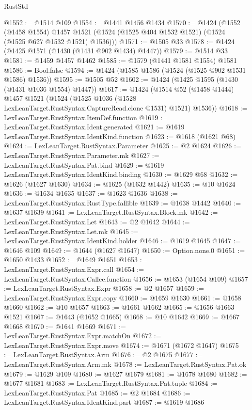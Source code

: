 \begin{lexlean}{RustStd}
\begin{coremodule}
@1552 := @1514 @109
@1554 := @1441 @1456 @1434
@1570 := @1424
    (@1552
      (@1458 @1554)
      @1457
      @1521
      (@1524 (@1525 @404 @1532 @1521) (@1524 (@1525 @627 @1532 @1521) @1536)))
@1571 := @1505 @33
@1578 := @1424 (@1425 @1571 (@1430 (@1431 @902 @1434) @1447))
@1579 := @1514 @33
@1581 := @1459 @1457 @1462
@1585 := @1579 (@1441 @1581 @1554) @1581
@1586 := Bool.false
@1594 := @1424 (@1585 @1586 (@1524 (@1525 @902 @1531 @1586) @1536))
@1595 := @1505 @52
@1602 := @1424 (@1425 @1595 (@1430 (@1431 @1036 @1554) @1447))
@1617 := @1424
    (@1514
      @52
      (@1458 @1444)
      @1457
      @1521
      (@1524 (@1525 @1036 (@1528 LexLeanTarget.RustSyntax.CaptureRead.clone @1531) @1521) @1536))
@1618 := LexLeanTarget.RustSyntax.ItemDef.function
@1619 := LexLeanTarget.RustSyntax.Ident.generated
@1621 := @1619 LexLeanTarget.RustSyntax.IdentKind.function
@1623 := @1618 (@1621 @68)
@1624 := LexLeanTarget.RustSyntax.Parameter
@1625 := @2 @1624
@1626 := LexLeanTarget.RustSyntax.Parameter.mk
@1627 := LexLeanTarget.RustSyntax.Pat.bind
@1629 := @1619 LexLeanTarget.RustSyntax.IdentKind.binding
@1630 := @1629 @68
@1632 := @1626 (@1627 @1630)
@1634 := @1625 (@1632 @1442)
@1635 := @10 @1624
@1636 := @1634 @1635
@1637 := @1623 @1636
@1638 := LexLeanTarget.RustSyntax.RustType.fallible
@1639 := @1638 @1442
@1640 := @1637 @1639
@1641 := LexLeanTarget.RustSyntax.Block.mk
@1642 := LexLeanTarget.RustSyntax.Let
@1643 := @2 @1642
@1644 := LexLeanTarget.RustSyntax.Let.mk
@1645 := LexLeanTarget.RustSyntax.IdentKind.holder
@1646 := @1619 @1645
@1647 := @1646 @109
@1649 := @1644 (@1627 @1647)
@1650 := Option.none.{0}
@1651 := @1650 @1433
@1652 := @1649 @1651
@1653 := LexLeanTarget.RustSyntax.Expr.call
@1654 := LexLeanTarget.RustSyntax.Callee.function
@1656 := @1653 (@1654 @109)
@1657 := LexLeanTarget.RustSyntax.Expr
@1658 := @2 @1657
@1659 := LexLeanTarget.RustSyntax.Expr.copy
@1660 := @1659 @1630
@1661 := @1658 @1660
@1662 := @10 @1657
@1663 := @1661 @1662
@1665 := @1656 @1663 @1521
@1667 := @1643 (@1652 @1665)
@1668 := @10 @1642
@1669 := @1667 @1668
@1670 := @1641 @1669
@1671 := LexLeanTarget.RustSyntax.Expr.matchOn
@1672 := LexLeanTarget.RustSyntax.Expr.move
@1674 := @1671 (@1672 @1647)
@1675 := LexLeanTarget.RustSyntax.Arm
@1676 := @2 @1675
@1677 := LexLeanTarget.RustSyntax.Arm.mk
@1678 := LexLeanTarget.RustSyntax.Pat.ok
@1679 := @1629 @109
@1680 := @1627 @1679
@1681 := @1678 @1680
@1682 := @1677 @1681
@1683 := LexLeanTarget.RustSyntax.Pat.tuple
@1684 := LexLeanTarget.RustSyntax.Pat
@1685 := @2 @1684
@1686 := LexLeanTarget.RustSyntax.IdentKind.part
@1687 := @1619 @1686

\end{coremodule}
\end{lexlean}

